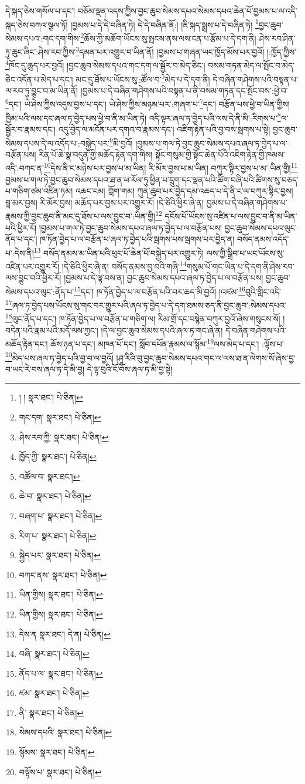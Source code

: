 དེ་སྐད་ཅེས་གསོལ་པ་དང་། བཅོམ་ལྡན་འདས་ཀྱིས་བྱང་ཆུབ་སེམས་དཔའ་སེམས་དཔའ་ཆེན་པོ་བྱམས་པ་ལ་འདི་སྐད་ཅེས་བཀའ་སྩལ་ཏོ། །བྱམས་པ་དེ་དེ་བཞིན་ཏེ། དེ་དེ་བཞིན་ནོ:། །ཇི་སྐད་སྨྲས་པ་དེ་བཞིན་ཏེ། \footnote{། །   སྣར་ཐང་།  པེ་ཅིན། }བྱང་ཆུབ་སེམས་དཔའ་:གང་དག་གིས་\footnote{གང་དག་  སྣར་ཐང་།  པེ་ཅིན། }ཆོས་ཀྱི་མཆོག་ཡོངས་སུ་སྤངས་ནས་ལས་ངན་པ་རྩོམ་པ་དེ་དག་ནི། ཤེས་རབ་ཤིན་ཏུ་ཆུང་ཞིང་:ཤེས་རབ་ཀྱིས་\footnote{ཤེས་རབ་ཀྱི་  སྣར་ཐང་།  པེ་ཅིན། }དམན་པར་འགྱུར་བ་ཡིན་ནོ། །བྱམས་པ་གཞན་ཡང་ཁྱོད་མོས་པར་བྱའོ། །:ཁྱོད་ཀྱིས་\footnote{ཁྱོད་ཀྱི་  སྣར་ཐང་།  པེ་ཅིན། }ཁོང་དུ་ཆུད་པར་བྱའོ། །བྱང་ཆུབ་སེམས་དཔའ་གང་དག་ལ་སྦྱོར་བ་མེད་ཅིང་། བསམ་གཏན་མེད་ལ་སྤོང་བ་མེད་ཅིང་འདོན་པ་མེད་པ་དང་། མང་དུ་ཐོས་པ་ཡོངས་སུ་:ཚོལ་བ་\footnote{འཚོལ་བ་  སྣར་ཐང་། }མེད་པ་དེ་དག་ནི། དེ་བཞིན་གཤེགས་པའི་བསྟན་པ་ལ་རབ་ཏུ་བྱུང་བ་མ་ཡིན་ནོ། །བྱམས་པ་དེ་བཞིན་གཤེགས་པའི་བསྟན་པ་ནི་བསམ་གཏན་དང་སྤོང་བས་:ཕྱེ་བ་\footnote{ཆེ་བ་  སྣར་ཐང་།  པེ་ཅིན། }དང་། ཡེ་ཤེས་ཀྱིས་འདུས་བྱས་པ་དང་། ཡེ་ཤེས་ཀྱིས་མཉམ་པར་:གཞག་པ་\footnote{བཞག་པ་  སྣར་ཐང་།  པེ་ཅིན། }དང་། བརྩོན་པས་ཕྱེ་བ་ཡིན་གྱིས། ཁྱིམ་པའི་ལས་དང་ཞལ་ཏ་བྱེད་པས་ཕྱེ་བ་ནི་མ་ཡིན་ཏེ། འདི་ལྟར་ཞལ་ཏ་བྱེད་པའི་ལས་དེ་ནི་མི་:རིགས་པ་\footnote{རིག་པ་  སྣར་ཐང་།  པེ་ཅིན། }ལ་སྦྱོར་བ་རྣམས་དང་། འདུ་བྱེད་ལ་མངོན་པར་དགའ་བ་རྣམས་དང་། འཇིག་རྟེན་པའི་བྱ་བས་སྦགས་པ་སྟེ། བྱང་ཆུབ་སེམས་དཔས་དེ་ལ་འདོད་པ་:བསྐྱེད་པར་\footnote{སྐྱེད་པར་  སྣར་ཐང་།  པེ་ཅིན། }མི་བྱའོ། །བྱམས་པ་གལ་ཏེ་བྱང་ཆུབ་སེམས་དཔའ་ཞལ་ཏ་བྱེད་པ་ལ་བརྩོན་པས། རིན་པོ་ཆེ་སྣ་བདུན་གྱི་མཆོད་རྟེན་དག་གིས། སྟོང་གསུམ་གྱི་སྟོང་ཆེན་པོའི་འཇིག་རྟེན་གྱི་ཁམས་འདི་:བཀང་ན་\footnote{བཀང་ནས་  སྣར་ཐང་།  པེ་ཅིན། }དེས་ནི་ང་མཉེས་པར་བྱས་པ་མ་ཡིན། རི་མོར་བྱས་པ་མ་ཡིན། བཀུར་སྟིར་བྱས་པ་མ་:ཡིན་གྱི།\footnote{ཡིན་གྱིས།  སྣར་ཐང་།  པེ་ཅིན། } བྱམས་པ་གལ་ཏེ་བྱང་ཆུབ་སེམས་དཔའ་ཐ་ན་ཕ་རོལ་ཏུ་ཕྱིན་པ་དྲུག་དང་ལྡན་པའི་ཚིག་བཞི་པའི་ཚིགས་སུ་བཅད་པ་གཅིག་ཙམ་འཛིན་ཏམ། འཆང་ངམ། ཀློག་གམ། ཀུན་ཆུབ་པར་བྱེད་དམ་འཆད་པ་དེ་ནི་ང་ལ་བཀུར་སྟིར་བྱས། བླ་མར་བྱས། རི་མོར་བྱས། མཆོད་པར་བྱས་པར་འགྱུར་རོ། །དེ་ཅིའི་ཕྱིར་ཞེ་ན། བྱམས་པ་དེ་བཞིན་གཤེགས་པ་རྣམས་ཀྱི་བྱང་ཆུབ་ནི་མང་དུ་ཐོས་པ་ལས་བྱུང་བ་:ཡིན་གྱི།\footnote{ཡིན་གྱིས།  སྣར་ཐང་།  པེ་ཅིན། } དངོས་པོ་ཡོངས་སུ་འཛིན་པ་ལས་བྱུང་བ་ནི་མ་ཡིན་པའི་ཕྱིར་རོ། །བྱམས་པ་གལ་ཏེ་བྱང་ཆུབ་སེམས་དཔའ་ཞལ་ཏ་བྱེད་པ་ལ་བརྩོན་པས། བྱང་ཆུབ་སེམས་དཔའ་ལུང་ནོད་པ་དང་། ཁ་ཏོན་བྱེད་པ་ལ་བརྩོན་པ་ཞལ་ཏ་བྱེད་པའི་སྦགས་པས་སྦགས་པར་བྱེད་ན། བསོད་ནམས་འདོད་པ་:དེས་ནི།\footnote{དེས་ན  སྣར་ཐང་། དེ་ན།  པེ་ཅིན། } བསོད་ནམས་མ་ཡིན་པའི་ཕུང་པོ་ཆེན་པོ་བསྐྱེད་པར་འགྱུར་ཏེ། ལས་ཀྱི་སྒྲིབ་པ་ཡང་ཡོངས་སུ་འཛིན་པར་འགྱུར་རོ། །དེ་ཅིའི་ཕྱིར་ཞེ་ན། བསོད་ནམས་བྱ་བའི་གཞི་\footnote{བཞི་  སྣར་ཐང་།  པེ་ཅིན། }གསུམ་པོ་གང་ཡིན་པ་དེ་དག་ནི་ཤེས་རབ་ལས་བྱུང་བའི་ཕྱིར་རོ། །བྱམས་པ་དེ་ལྟ་བས་ན། བྱང་ཆུབ་སེམས་དཔའ་ཞལ་ཏ་བྱེད་པ་ལ་བརྩོན་པས། བྱང་ཆུབ་སེམས་དཔའ་ལུང་:ནོད་པ་\footnote{ནོད་པ་ལ་  སྣར་ཐང་།  པེ་ཅིན། }དང་། ཁ་ཏོན་བྱེད་པ་ལ་བརྩོན་པའི་བར་ཆད་མི་བྱའོ། །འཛམ་\footnote{ཛམ་  སྣར་ཐང་།  པེ་ཅིན། }བུའི་གླིང་འདི་\footnote{ནི་  སྣར་ཐང་།  པེ་ཅིན། }ཞལ་ཏ་བྱེད་པས་ཡོངས་སུ་གང་བར་གྱུར་པའི་ཞལ་ཏ་བྱེད་པ་དེ་དག་ཐམས་ཅད་ནི་བྱང་ཆུབ་:སེམས་དཔའ་\footnote{སེམས་དཔའི་  སྣར་ཐང་།  པེ་ཅིན། }ལུང་ནོད་པ་དང་། ཁ་ཏོན་བྱེད་པ་ལ་བརྩོན་པ་གཅིག་ལ། རིམ་གྲོ་དང་བསྙེན་བཀུར་བྱའོ་ཞེས་གསུངས་སོ། །བདེན་པའི་རྣམ་པའི་མདོ་ལས་ཀྱང་། །དེ་ལ་བྱང་ཆུབ་སེམས་དཔའི་ཞལ་ཏ་གང་ཞེ་ན། དེ་བཞིན་གཤེགས་པའི་མཆོད་རྟེན་དང་། ཆོས་ཉན་པ་དང་། མཁན་པོ་དང་། སློབ་དཔོན་རྣམས་ལ་སྙོམ་\footnote{སྙོམས་  སྣར་ཐང་།  པེ་ཅིན། }ལས་མེད་པ་དང་། :ལྟོས་པ་\footnote{བལྟོས་པ་  སྣར་ཐང་།  པེ་ཅིན། }མེད་པས་ཞལ་ཏ་བྱེད་པའི་བྱ་བ་ལ་བྱའོ། །ཤཱ་རིའི་བུ་བྱང་ཆུབ་སེམས་དཔའ་གང་ལ་ལས་ཐ་ན་ལེགས་སོ་ཞེས་བྱ་བ་ཡང་རེ་བས་ཞལ་ཏ་དེ་མི་བྱ། དེ་ལྟ་བུའི་ངོ་བོས་ཞལ་ཏ་མི་བྱ་སྟེ། 